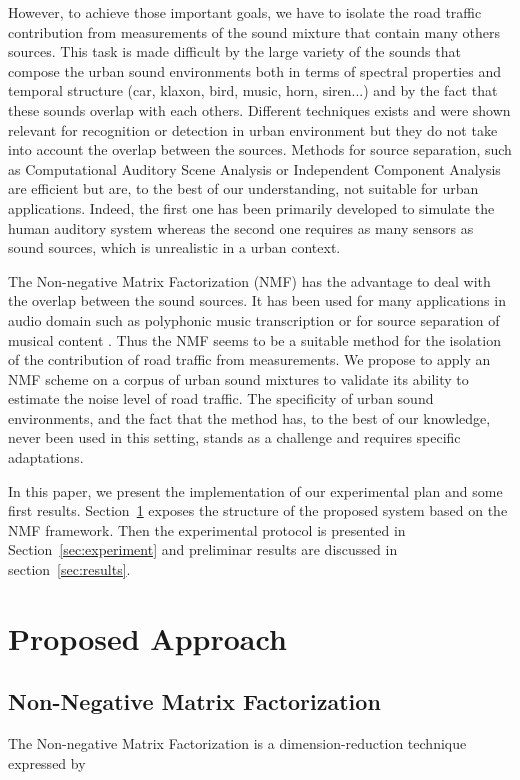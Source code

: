 \documentclass{article}
\begin{document}
\begin{sloppy}
However, to achieve those important goals, we have to isolate the road traffic contribution from measurements  of the sound mixture that contain many others sources. This task is made difficult by the large variety of the sounds that compose the urban sound environments both in terms of spectral properties and temporal structure (car, klaxon, bird, music, horn, siren...) and by the fact that these sounds overlap with each others. Different techniques exists and were shown relevant for recognition or detection in urban environment \cite{Aucouturier} \cite{defreville} but they do not take into account the overlap between the sources. Methods for source separation, such as Computational Auditory Scene Analysis \cite{brown} or Independent Component Analysis \cite{comon} are efficient but are, to the best of our understanding, not suitable for urban applications. Indeed, the first one has been primarily developed to simulate the human auditory system whereas the second one requires as many sensors as sound sources, which is unrealistic in a urban context.

The Non-negative Matrix Factorization (NMF) \cite{lee1999} has the advantage to deal with the overlap between the sound sources. It has been used for many applications in audio domain such as polyphonic music transcription \cite{smaragdis2003} or for source separation of musical content \cite{Virtanen2005}. Thus the NMF seems to be a suitable method for the isolation of the contribution of road traffic from measurements. We propose to apply an NMF scheme on a corpus of urban sound mixtures to validate its ability to estimate the noise level of road traffic. The specificity of urban sound environments, and the fact that the method has, to the best of our knowledge, never been used in this setting, stands as a challenge and requires specific adaptations.

In this paper, we present the implementation of our experimental plan and some first results. Section~\ref{sec:method} exposes the structure of the proposed system based on the NMF framework. Then the experimental protocol is presented in Section~\ref{sec:experiment} and preliminar results are discussed in section~\ref{sec:results}.


\section{Proposed Approach}\label{sec:method}


\subsection{Non-Negative Matrix Factorization}
The Non-negative Matrix Factorization is a dimension-reduction technique expressed by


\end{sloppy}
\end{document}
